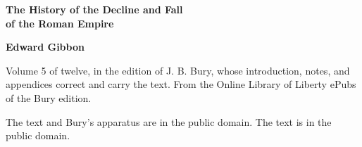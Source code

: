 \documentclass[11pt,letterpaper]{article}
\begin{document}
\color{ink}

\begin{titlepage}
\centering
\vspace*{4em}
{\LARGE\bfseries\color{heading} The History of the Decline and Fall\\[0.3em]of the Roman Empire\par}
\vspace{2em}
{\Large\bfseries\color{heading} Edward Gibbon\par}
\vspace{2.5em}
{\itshape\color{subhead}\parbox{0.8\linewidth}{\centering Volume 5 of twelve, in the edition of J. B. Bury, whose introduction, notes, and appendices correct and carry the text. From the Online Library of Liberty ePubs of the Bury edition.\par}}
\vfill
{\small The text and Bury's apparatus are in the public domain. The text is in the public domain.\par}
\vspace{2em}
\end{titlepage}

\tableofcontents


\end{document}
